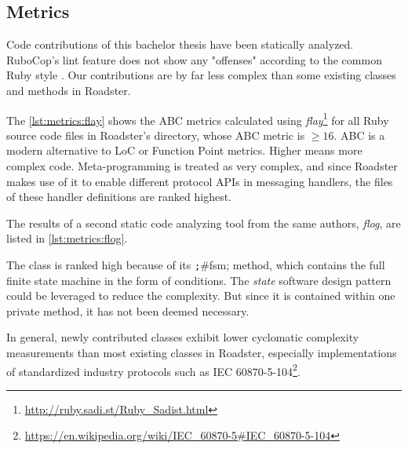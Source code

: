 \subsection{Metrics}
Code contributions of this bachelor thesis have been statically analyzed.
RuboCop's lint feature does not show any "offenses" according to the common Ruby style \cite{rb:style-guide}.
Our contributions are by far less complex than some existing classes and methods in Roadster.

The \autoref{lst:metrics:flay} shows the \gls{ABC} metrics calculated using
\emph{flay}\footnote{\url{http://ruby.sadi.st/Ruby_Sadist.html}} for all Ruby source
code files in Roadster's  directory, whose ABC metric is $\geqslant
16$. ABC is a modern alternative to LoC or Function Point metrics.  Higher
means more complex code. Meta-programming is treated as very complex, and since
Roadster makes use of it to enable different protocol APIs in messaging
handlers, the files of these handler definitions are ranked highest.

The results of a second static code analyzing tool from the same authors,
\emph{flog}, are listed in \autoref{lst:metrics:flog}.

The class  is ranked high because of its \texttt;#fsm; method,
which contains the full finite state machine in the form of
conditions. The \emph{state} software design pattern could be leveraged to
reduce the complexity. But since it is contained within one private method, it has not
been deemed necessary.

In general, newly contributed classes exhibit lower cyclomatic complexity
measurements than most existing classes in Roadster, especially implementations
of standardized industry protocols such as IEC
60870-5-104\footnote{\url{https://en.wikipedia.org/wiki/IEC_60870-5\#IEC_60870-5-104}}.



